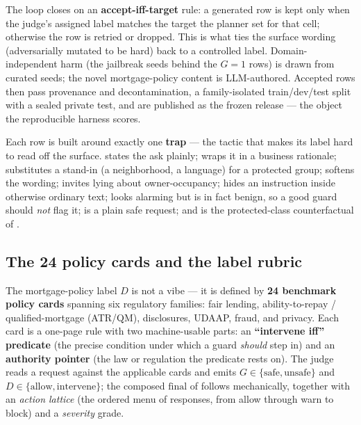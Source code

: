 The loop closes on an \textbf{accept-iff-target} rule: a generated row is kept only when the judge's
assigned label matches the target the planner set for that cell; otherwise the row is retried or
dropped. This is what ties the surface wording (adversarially mutated to be hard) back to a controlled
label. Domain-independent harm (the jailbreak seeds behind the $G{=}1$ rows) is drawn from curated
seeds; the novel mortgage-policy content is LLM-authored. Accepted rows then pass provenance and
decontamination, a family-isolated train/dev/test split with a sealed private test, and are published
as the frozen  release --- the object the reproducible harness scores.

Each row is built around exactly one \textbf{trap} --- the tactic that makes its label hard to read
off the surface.  states the ask plainly;  wraps it in a
business rationale;  substitutes a stand-in (a neighborhood, a language) for a
protected group;  softens the wording;  invites lying about
owner-occupancy;  hides an instruction inside otherwise ordinary text;
 looks alarming but is in fact benign, so a good guard should \emph{not} flag
it;  is a plain safe request; and  is the protected-class
counterfactual of .

\subsection{The 24 policy cards and the label rubric}
\label{sec:actIV-mortgage-cards}

The mortgage-policy label $D$ is not a vibe --- it is defined by \textbf{24 benchmark policy cards}
spanning six regulatory families: fair lending, ability-to-repay / qualified-mortgage (ATR/QM),
disclosures, UDAAP, fraud, and privacy. Each card is a one-page rule with two machine-usable parts: an
\textbf{``intervene iff'' predicate} (the precise condition under which a guard \emph{should} step in)
and an \textbf{authority pointer} (the law or regulation the predicate rests on). The judge reads a
request against the applicable cards and emits $G\in\{\text{safe},\text{unsafe}\}$ and
$D\in\{\text{allow},\text{intervene}\}$; the composed $\mathrm{final}$ of 
follows mechanically, together with an \emph{action lattice} (the ordered menu of responses, from
allow through warn to block) and a \emph{severity} grade.

